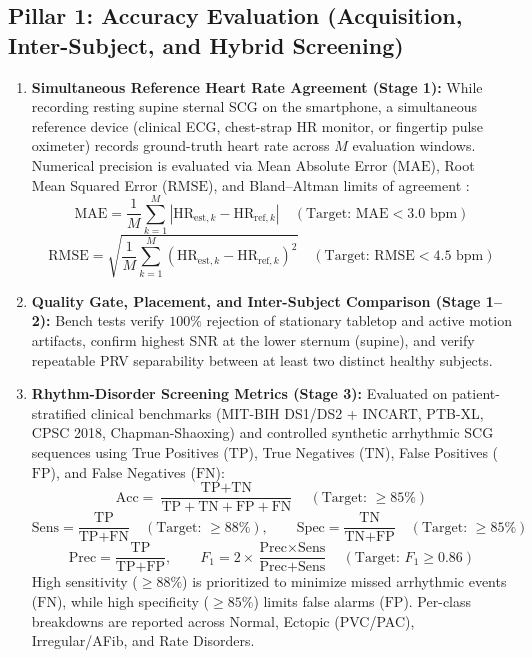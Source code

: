 \subsection{Pillar 1: Accuracy Evaluation (Acquisition, Inter-Subject, and Hybrid Screening)}
\begin{enumerate}
	\item \textbf{Simultaneous Reference Heart Rate Agreement (Stage 1):} While recording resting supine sternal SCG on the smartphone, a simultaneous reference device (clinical ECG, chest-strap HR monitor, or fingertip pulse oximeter) records ground-truth heart rate across $M$ evaluation windows. Numerical precision is evaluated via Mean Absolute Error ($\text{MAE}$), Root Mean Squared Error ($\text{RMSE}$), and Bland--Altman limits of agreement \cite{bland1986statistical}:
	\begin{equation}
		\text{MAE} = \frac{1}{M}\sum_{k=1}^M \left| \text{HR}_{\text{est},k} - \text{HR}_{\text{ref},k} \right| \quad (\text{Target: } \text{MAE} < 3.0\text{ bpm})
	\end{equation}
	\begin{equation}
		\text{RMSE} = \sqrt{\frac{1}{M}\sum_{k=1}^M (\text{HR}_{\text{est},k} - \text{HR}_{\text{ref},k})^2} \quad (\text{Target: } \text{RMSE} < 4.5\text{ bpm})
	\end{equation}
	\item \textbf{Quality Gate, Placement, and Inter-Subject Comparison (Stage 1--2):} Bench tests verify $100\%$ rejection of stationary tabletop and active motion artifacts, confirm highest SNR at the lower sternum (supine), and verify repeatable PRV separability between at least two distinct healthy subjects.
	\item \textbf{Rhythm-Disorder Screening Metrics (Stage 3):} Evaluated on patient-stratified clinical benchmarks (MIT-BIH DS1/DS2 \cite{dechazal2004automatic} + INCART, PTB-XL, CPSC 2018, Chapman-Shaoxing) and controlled synthetic arrhythmic SCG sequences using True Positives ($\text{TP}$), True Negatives ($\text{TN}$), False Positives ($\text{FP}$), and False Negatives ($\text{FN}$):
	\begin{equation}
		\text{Acc} = \frac{\text{TP} + \text{TN}}{\text{TP} + \text{TN} + \text{FP} + \text{FN}} \quad (\text{Target: } \ge 85\%)
	\end{equation}
	\begin{equation}
		\text{Sens} = \frac{\text{TP}}{\text{TP} + \text{FN}} \quad (\text{Target: } \ge 88\%), \qquad \text{Spec} = \frac{\text{TN}}{\text{TN} + \text{FP}} \quad (\text{Target: } \ge 85\%)
	\end{equation}
	\begin{equation}
		\text{Prec} = \frac{\text{TP}}{\text{TP} + \text{FP}}, \qquad F_1 = 2 \times \frac{\text{Prec} \times \text{Sens}}{\text{Prec} + \text{Sens}} \quad (\text{Target: } F_1 \ge 0.86)
	\end{equation}
	High sensitivity ($\ge 88\%$) is prioritized to minimize missed arrhythmic events ($\text{FN}$), while high specificity ($\ge 85\%$) limits false alarms ($\text{FP}$). Per-class breakdowns are reported across Normal, Ectopic (PVC/PAC), Irregular/AFib, and Rate Disorders.
\end{enumerate}


